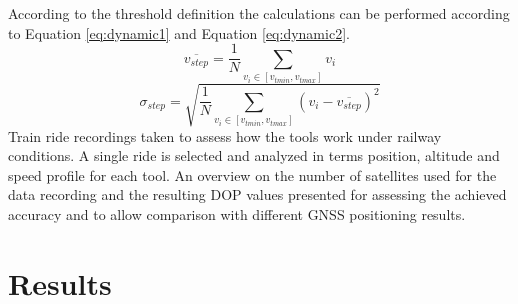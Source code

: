 \documentclass{article}
\begin{document}
			According to the threshold definition the calculations can be performed according to Equation \ref{eq:dynamic1} and Equation \ref{eq:dynamic2}. \\
			\begin{equation} \label{eq:dynamic1}
				\overline{v_{step}}=\frac{1}{N}\sum_{v_i \in [v_{tmin}, v_{tmax}]} v_i
			\end{equation}
			\begin{equation} \label{eq:dynamic2}
				\sigma_{step}=\sqrt{\frac{1}{N}\sum_{v_i \in [v_{tmin}, v_{tmax}]} (v_i-\overline{v_{step}})^2}
			\end{equation}
			Train ride recordings taken to assess how the tools work under railway conditions. A single ride is selected and analyzed in terms position, altitude and speed profile for each tool.
			An overview on the number of satellites used for the data recording and the resulting DOP values presented for assessing the achieved accuracy and to allow comparison with different GNSS positioning results.
	\section{Results}
\end{document}
